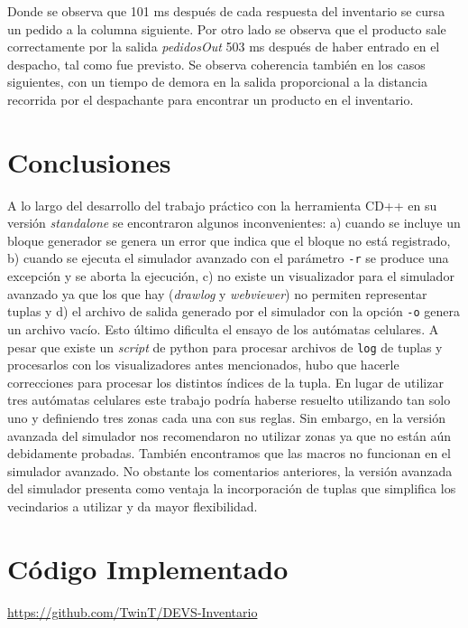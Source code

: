 \documentclass[10pt]{article}
\begin{document}
Donde se observa que 101 ms después de cada respuesta del inventario se cursa un pedido a la columna siguiente. Por otro lado se observa que el producto sale correctamente por la salida \textit{pedidosOut} 503 ms después de haber entrado en el despacho, tal como fue previsto. Se observa coherencia también en los casos siguientes, con un tiempo de demora en la salida proporcional a la distancia recorrida por el despachante para encontrar un producto en el inventario.

\section{Conclusiones}

A lo largo del desarrollo del trabajo práctico con la herramienta CD++ en su versión \textit{standalone} se encontraron algunos inconvenientes: a) cuando se incluye un bloque generador se genera un error que indica que el bloque no está registrado, b) cuando se ejecuta el simulador avanzado con el parámetro \texttt{-r} se produce una excepción y se aborta la ejecución, c) no existe un visualizador para el simulador avanzado ya que los que hay (\textit{drawlog} y \textit{webviewer}) no permiten representar tuplas y d) el archivo de salida generado por el simulador con la opción \texttt{-o} genera un archivo vacío. Esto último dificulta el ensayo de los autómatas celulares. A pesar que existe un \textit{script} de python para procesar archivos de \texttt{log} de tuplas y procesarlos con los visualizadores antes mencionados, hubo que hacerle correcciones para procesar los distintos índices de la tupla. En lugar de utilizar tres autómatas celulares este trabajo podría haberse resuelto utilizando tan solo uno y definiendo tres zonas cada una con sus reglas. Sin embargo, en la versión avanzada del simulador nos recomendaron no utilizar zonas ya que no están aún debidamente probadas. También encontramos que las macros no funcionan en el simulador avanzado. No obstante los comentarios anteriores, la versión avanzada del simulador presenta como ventaja la incorporación de tuplas que simplifica los vecindarios a utilizar y da mayor flexibilidad.


\appendix
\section{Código Implementado}

\url{https://github.com/TwinT/DEVS-Inventario}



\end{document}
